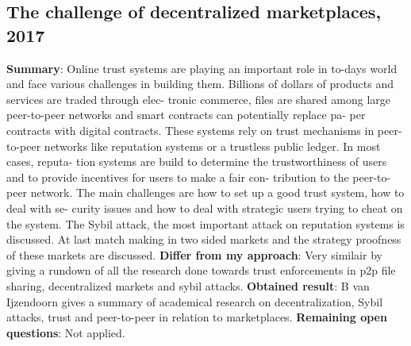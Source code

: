 \documentclass[11pt]{article}
\begin{document}
\subsection{The challenge of decentralized marketplaces, 2017 \cite{challangeDecentralizedMarketplaces}}
\textbf{Summary}: Online trust systems are playing an important role in to-days world and face various challenges in building them. Billions of dollars of products and services are traded through elec- tronic commerce, files are shared among large peer-to-peer networks and smart contracts can potentially replace pa- per contracts with digital contracts. These systems rely on trust mechanisms in peer-to-peer networks like reputation systems or a trustless public ledger. In most cases, reputa- tion systems are build to determine the trustworthiness of users and to provide incentives for users to make a fair con- tribution to the peer-to-peer network. The main challenges are how to set up a good trust system, how to deal with se- curity issues and how to deal with strategic users trying to cheat on the system. The Sybil attack, the most important attack on reputation systems is discussed. At last match making in two sided markets and the strategy proofness of these markets are discussed.\newline
\textbf{Differ from my approach}: Very similair by giving a rundown of all the research done towards trust enforcements in p2p file sharing, decentralized markets and sybil attacks. \newline
\textbf{Obtained result}: B van Ijzendoorn gives a summary of academical research on decentralization, Sybil attacks, trust and peer-to-peer in relation to marketplaces. \newline
\textbf{Remaining open questions}: Not applied.\newline
\end{document}

